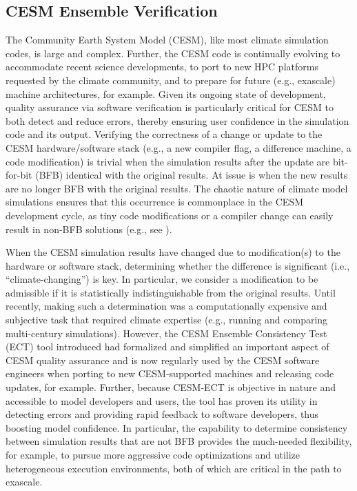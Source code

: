 \subsection{CESM Ensemble Verification} \label{sec:pycect}

The Community Earth System Model (CESM), like most climate simulation
codes, is large and complex.  Further, the CESM code is continually
evolving to accommodate recent science developments, to port to new
HPC platforms requested by the climate community, and to prepare for
future (e.g., exascale) machine architectures, for example. Given its
ongoing state of development, quality assurance via software
verification is particularly critical for CESM to both detect and
reduce errors, thereby ensuring user confidence in the simulation code
and its output. Verifying the correctness of a change or update to the
CESM hardware/software stack (e.g., a new compiler flag, a difference
machine, a code modification) is trivial when the simulation results
after the update are bit-for-bit (BFB) identical with the original
results.  At issue is when the new results are no longer BFB with the
original results.  The chaotic nature of climate model simulations ensures that this
occurrence is commonplace in the CESM development cycle, as tiny code
modifications or a compiler change can easily result in non-BFB solutions
(e.g., see \cite{milroy2016}).

When the CESM simulation results have changed due to modification(s)
to the hardware or software stack, determining whether the difference
is significant (i.e., ``climate-changing'') is key.  In particular, we
consider a modification to be admissible if it is statistically
indistinguishable from the original results.  Until recently, making
such a determination was a computationally expensive and subjective
task that required climate expertise (e.g., running and comparing
multi-century simulations).  However, the CESM Ensemble Consistency
Test (ECT) tool introduced \cite{baker2015} had formalized and
simplified an important aspect of CESM quality assurance and is now
regularly used by the CESM software engineers when porting to new
CESM-supported machines and releasing code updates, for
example. Further, because CESM-ECT is objective in nature and
accessible to model developers and users, the tool has proven its
utility in detecting errors and providing rapid feedback to software
developers, thus boosting model confidence.  In particular, the
capability to determine consistency between simulation results that
are not BFB provides the much-needed flexibility, for example, to
pursue more aggressive code optimizations and utilize heterogeneous
execution environments, both of which are critical in the path to
exascale.



